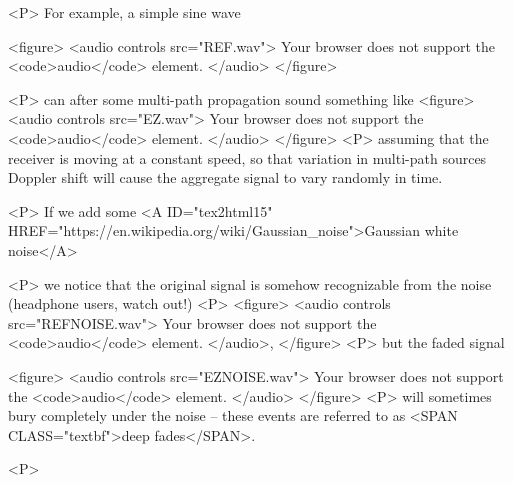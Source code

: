 <P>
  For example, a simple sine wave

  <figure>
    <audio
      controls
      src="REF.wav">
      Your browser does not support the
      <code>audio</code> element.
    </audio>
  </figure>
  
<P>
  can after some multi-path propagation sound something like
  <figure>
    <audio
      controls
      src="EZ.wav">
      Your browser does not support the
      <code>audio</code> element.
    </audio>
  </figure>
<P>
  assuming that the receiver is moving at a constant speed, so that variation in multi-path sources Doppler shift will cause the aggregate signal to vary randomly in time.

<P>
  If we add some <A ID="tex2html15"
		    HREF="https://en.wikipedia.org/wiki/Gaussian_noise">Gaussian white noise</A>

<P>
  we notice that the original signal is somehow recognizable from the noise (headphone users, watch out!)
<P>
  <figure>
    <audio
      controls
      src="REFNOISE.wav">
      Your browser does not support the
      <code>audio</code> element.
    </audio>,
  </figure>        
<P>
  but the faded signal

  <figure>
    <audio
      controls
      src="EZNOISE.wav">
      Your browser does not support the
      <code>audio</code> element.
    </audio>
  </figure>        
<P>
will sometimes bury completely under the noise – these events are referred to as <SPAN  CLASS="textbf">deep fades</SPAN>.

<P>
